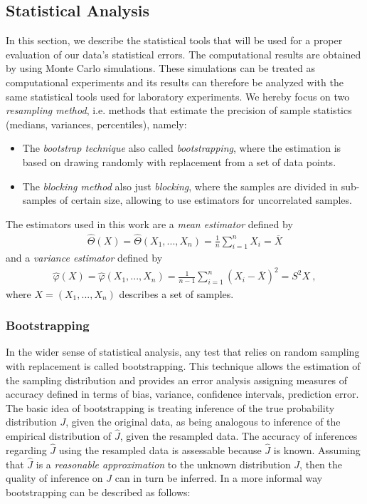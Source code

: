 \documentclass[11pt,a4paper]{article}
\numberwithin{equation}{section}
\begin{document}
  
\subsection{Statistical Analysis}
%
%
%
In this section, we describe the statistical tools that will be used for a proper evaluation of our data's statistical errors.
%
The computational results are obtained by using Monte Carlo simulations.
%
These simulations can be treated as computational experiments and its results can therefore be analyzed with the same statistical tools used for laboratory experiments.
%
We hereby focus on two {\it resampling method}, i.e. methods that estimate the precision of sample statistics (medians, variances, percentiles), namely:
\begin{itemize}
\item The \textit{bootstrap technique} also called \textit{bootstrapping}, where the estimation is based on drawing randomly with replacement from a set of data points.
\item The \textit{blocking method} also just \textit{blocking}, where the samples are divided in sub-samples of certain size, allowing to use estimators for uncorrelated samples. 
\end{itemize}
%
The estimators used in this work are a {\it mean estimator} defined by 
\begin{align*}
\hat \Theta(X)= \hat \Theta(X_1,...,X_n) = \frac{1}{n}\sum_{i=1}^nX_i=\overline{X}
\end{align*}
and a {\it variance estimator} defined by 
\begin{align*}
\hat \varphi(X)=\hat \varphi(X_1,...,X_n) = \frac{1}{n-1}\sum_{i=1}^n(X_i-\overline{X})^2=S^2X~,
\end{align*}
where $X= (X_1,...,X_n)$ describes a set of samples.
\subsubsection{Bootstrapping}
%
%
In the wider sense of statistical analysis, any test that relies on random sampling with replacement is called bootstrapping.
%
This technique allows the estimation of the sampling distribution and provides an error analysis assigning measures of accuracy defined in terms of bias, variance, confidence intervals, prediction error.  
%
The basic idea of bootstrapping is treating inference of the true probability distribution $J$, given the original data, as being analogous to inference of the empirical distribution of $\hat J$, given the resampled data.
%
The accuracy of inferences regarding $\hat J$ using the resampled data is assessable because $\hat J$ is known. 
%
Assuming that $\hat J$ is a {\it reasonable approximation} to the unknown distribution $J$, then the quality of inference on $J$ can in turn be inferred.
%
In a more informal way bootstrapping can be described as follows:
\end{document}

